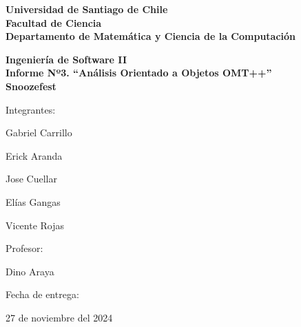 \begin{titlepage}

\begin{center}
	{\bf Universidad de Santiago de Chile}
	\\
    {\bf Facultad de Ciencia}
	\\
    {\bf Departamento de Matem\'atica y Ciencia de la Computaci\'on}
\end{center}

%

\vfill
\begin{center}
{\large\bf Ingeniería de Software II}
\\
{\Large\bf Informe Nº3. “Análisis Orientado a Objetos OMT++”}\\
\vspace{1cm}
{\Huge\bf Snoozefest}
\end{center}
\vfill

%

\begin{flushright}
	\begin{minipage}{0.3\textwidth}
		Integrantes:
		\begin{simplelist}
			\item Gabriel Carrillo
			\item Erick Aranda
			\item Jose Cuellar
			\item Elías Gangas
			\item Vicente Rojas
		\end{simplelist}
	

		Profesor:
		\begin{simplelist}
			\item Dino Araya
		\end{simplelist}
	
		Fecha de entrega:
		\begin{simplelist}
			\item 27 de noviembre del 2024
		\end{simplelist}
	\end{minipage}
\end{flushright}

\end{titlepage}
